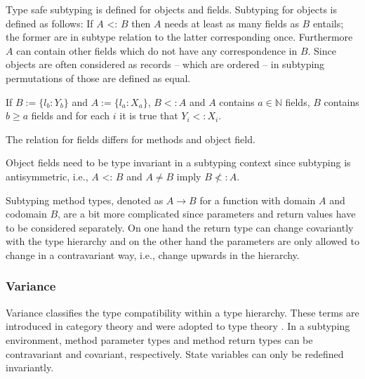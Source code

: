 Type safe subtyping is defined for objects and fields. Subtyping for
objects is defined as follows: If $A$ <: $B$ then $A$ needs at least as
many fields as $B$ entails; the former are in subtype relation to the
latter corresponding once. Furthermore $A$ can contain other fields which
do not have any correspondence in $B$. Since objects are often considered
as records -- which are ordered -- in subtyping permutations of those
are defined as equal.
\begin{defn}
	\label{def:subtypeObject}
	If $B := \{l_b : Y_b\}$ and $A := \{l_a : X_a\}$, $B <: A$ and $A$
	contains $a \in \mathbb{N}$ fields, $B$ contains $b \geq a$
	fields and for each $i$ it is true that $Y_i <: X_i$.
\end{defn}

The relation for fields differs for methods and object field.

Object fields need to be type invariant in a subtyping context since
subtyping is antisymmetric, i.e., $A$ <: $B$ and $A \neq B$ imply $B \nless: A$.

Subtyping method types, denoted as $A \rightarrow B$ for a function with
domain $A$ and codomain $B$, are a bit more complicated since parameters
and return values have to be considered separately. On one hand the return
type can change covariantly with the type hierarchy and on the other hand
the parameters are only allowed to change in a contravariant way, i.e.,
change upwards in the hierarchy.

\begin{defn}
\label{def:methodSubtyping}
	\begin{mathpar}
	\end{mathpar}
\end{defn}

\subsubsection{Variance}
Variance classifies the type compatibility within a type hierarchy. These
terms are introduced in category theory and were adopted to type theory
\cite{pierce_basic_1991}. In a subtyping environment, method parameter types and
method return types can be contravariant and covariant, respectively. State variables
can only be redefined invariantly.


